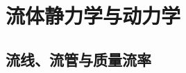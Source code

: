 \hypersetup{bookmarksdepth=3}
\begingroup
\renewcommand{\Needspace}[1]{\par\begingroup
\dimen0=#1\relax\vskip0pt plus\dimen0\penalty-100
\vskip0pt plus-\dimen0\vskip\dimen0\penalty9999\vskip-\dimen0
\vskip0pt\endgroup}
\chapter{流体静力学与动力学}



{
\graphicspath{{../../../sample/xes-original/kinematics-supplement/}{../../../sample/xes-original/kinematics-supplement/assets/}}
\section{流线、流管与质量流率}
\newcommand{\SphereStreamlinesDiagram}{%
\begin{center}\begin{minipage}{\linewidth}\centering\begin{tikzpicture}[scale=.85,>=Latex]
 \shade[ball color=TextGray!35] (0,0) circle (1.2);

\end{tikzpicture}
\end{minipage}
\end{center}}}
